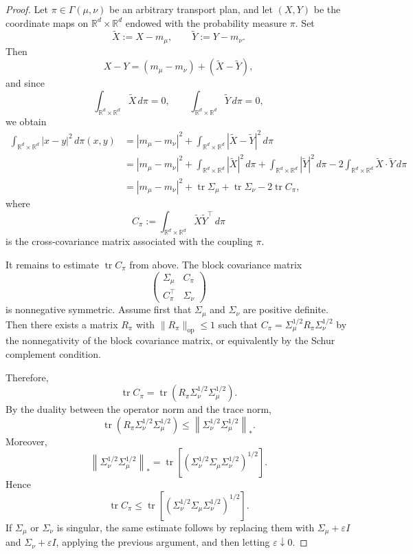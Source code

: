 \documentclass[11pt,reqno]{amsart}
\numberwithin{figure}{section}
\newcommand{\bbr}{\mathbb R}
\newcommand{\dm}{d}
\begin{document}
\begin{proof}
Let $\pi\in\Gamma(\mu,\nu)$ be an arbitrary transport plan, and let $(X,Y)$ be the coordinate
maps on $\mathbb R^d\times\mathbb R^d$ endowed with the probability measure
$\pi$. Set
\[
\widetilde X:=X-m_\mu,
\qquad
\widetilde Y:=Y-m_\nu.
\]
Then
\[
X-Y=(m_\mu-m_\nu)+(\widetilde X-\widetilde Y),
\]
and since
\[
\int_{\bbr^d\times \bbr^d} \widetilde X\,d\pi=0,
\qquad
\int_{\bbr^d\times \bbr^d} \widetilde Y\,d\pi=0,
\]
we obtain
\[
\begin{aligned}
\int_{\mathbb R^{d}\times\bbr^\dm} |x-y|^2\,d\pi(x,y)
&=
|m_\mu-m_\nu|^2
+
\int_{\bbr^\dm\times\bbr^\dm} |\widetilde X-\widetilde Y|^2\,d\pi \\
&=
|m_\mu-m_\nu|^2
+
\int_{\bbr^\dm\times\bbr^\dm} |\widetilde X|^2\,d\pi
+
\int_{\bbr^\dm\times\bbr^\dm} |\widetilde Y|^2\,d\pi
-
2\int_{\bbr^\dm\times\bbr^\dm} \widetilde X\cdot\widetilde Y\,d\pi \\
&=
|m_\mu-m_\nu|^2
+
\operatorname{tr}\Sigma_\mu
+
\operatorname{tr}\Sigma_\nu
-
2\operatorname{tr}C_\pi,
\end{aligned}
\]
where
\[
C_\pi:=
\int_{\mathbb R^{d}\times\bbr^\dm}
\widetilde X\widetilde Y^\top\,d\pi
\]
is the cross-covariance matrix associated with the coupling $\pi$.

It remains to estimate $\operatorname{tr}C_\pi$ from above. The block covariance
matrix
\[
\begin{pmatrix}
\Sigma_\mu & C_\pi \\
C_\pi^\top & \Sigma_\nu
\end{pmatrix}
\]
is nonnegative symmetric. Assume first that \(\Sigma_\mu\) and \(\Sigma_\nu\) are positive definite. Then there exists a matrix $R_\pi$ with
$\|R_\pi\|_{\mathrm{op}}\le1$ such that $C_\pi=\Sigma_\mu^{1/2}R_\pi\Sigma_\nu^{1/2}$ by the nonnegativity of the block covariance matrix, or equivalently by the Schur complement condition.

Therefore,
\[
\operatorname{tr}C_\pi
=
\operatorname{tr}
\left(
R_\pi\Sigma_\nu^{1/2}\Sigma_\mu^{1/2}
\right).
\]
By the duality between the operator norm and the trace norm,
\[
\operatorname{tr}
\left(
R_\pi\Sigma_\nu^{1/2}\Sigma_\mu^{1/2}
\right)
\le
\left\|
\Sigma_\nu^{1/2}\Sigma_\mu^{1/2}
\right\|_*.
\]
Moreover,
\[
\left\|
\Sigma_\nu^{1/2}\Sigma_\mu^{1/2}
\right\|_*
=
\operatorname{tr}
\left[
\left(
\Sigma_\nu^{1/2}\Sigma_\mu\Sigma_\nu^{1/2}
\right)^{1/2}
\right].
\]
Hence
\[
\operatorname{tr}C_\pi
\le
\operatorname{tr}
\left[
\left(
\Sigma_\nu^{1/2}\Sigma_\mu\Sigma_\nu^{1/2}
\right)^{1/2}
\right].
\]
If $\Sigma_\mu$ or $\Sigma_\nu$ is singular, the same estimate follows by
replacing them with $\Sigma_\mu+\varepsilon I$ and
$\Sigma_\nu+\varepsilon I$, applying the previous argument, and then letting
$\varepsilon\downarrow0$.


\end{proof}
\end{document}

